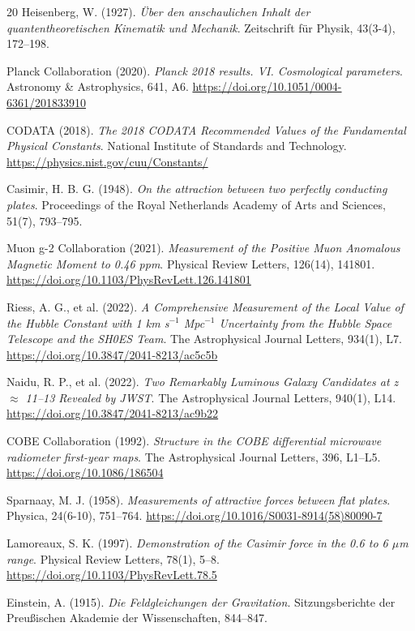 \begin{thebibliography}{20}
		Heisenberg, W. (1927). 
		\textit{Über den anschaulichen Inhalt der quantentheoretischen Kinematik und Mechanik}. 
		Zeitschrift für Physik, 43(3-4), 172--198.
		
		Planck Collaboration (2020). 
		\textit{Planck 2018 results. VI. Cosmological parameters}. 
		Astronomy \& Astrophysics, 641, A6. 
		\url{https://doi.org/10.1051/0004-6361/201833910}
		
		CODATA (2018). 
		\textit{The 2018 CODATA Recommended Values of the Fundamental Physical Constants}. 
		National Institute of Standards and Technology. 
		\url{https://physics.nist.gov/cuu/Constants/}
		
		Casimir, H. B. G. (1948). 
		\textit{On the attraction between two perfectly conducting plates}. 
		Proceedings of the Royal Netherlands Academy of Arts and Sciences, 51(7), 793--795.
		
		Muon g-2 Collaboration (2021). 
		\textit{Measurement of the Positive Muon Anomalous Magnetic Moment to 0.46 ppm}. 
		Physical Review Letters, 126(14), 141801. 
		\url{https://doi.org/10.1103/PhysRevLett.126.141801}
		
		Riess, A. G., et al. (2022). 
		\textit{A Comprehensive Measurement of the Local Value of the Hubble Constant with 1 km s$^{-1}$ Mpc$^{-1}$ Uncertainty from the Hubble Space Telescope and the SH0ES Team}. 
		The Astrophysical Journal Letters, 934(1), L7. 
		\url{https://doi.org/10.3847/2041-8213/ac5c5b}
		
		Naidu, R. P., et al. (2022). 
		\textit{Two Remarkably Luminous Galaxy Candidates at z $\approx$ 11--13 Revealed by JWST}. 
		The Astrophysical Journal Letters, 940(1), L14. 
		\url{https://doi.org/10.3847/2041-8213/ac9b22}
		
		COBE Collaboration (1992). 
		\textit{Structure in the COBE differential microwave radiometer first-year maps}. 
		The Astrophysical Journal Letters, 396, L1--L5. 
		\url{https://doi.org/10.1086/186504}
		
		Sparnaay, M. J. (1958). 
		\textit{Measurements of attractive forces between flat plates}. 
		Physica, 24(6-10), 751--764. 
		\url{https://doi.org/10.1016/S0031-8914(58)80090-7}
		
		Lamoreaux, S. K. (1997). 
		\textit{Demonstration of the Casimir force in the 0.6 to 6 $\mu$m range}. 
		Physical Review Letters, 78(1), 5--8. 
		\url{https://doi.org/10.1103/PhysRevLett.78.5}
		
		Einstein, A. (1915). 
		\textit{Die Feldgleichungen der Gravitation}. 
		Sitzungsberichte der Preußischen Akademie der Wissenschaften, 844--847.
		
	\end{thebibliography}
	